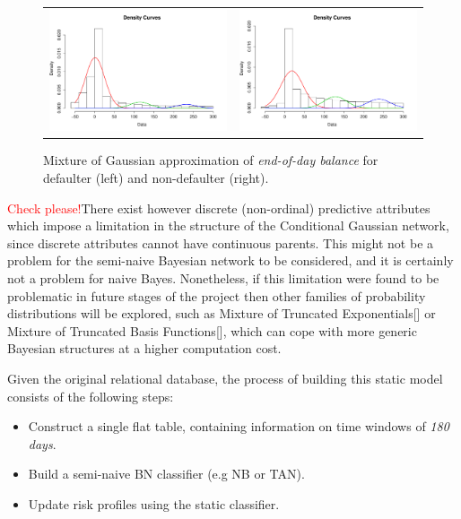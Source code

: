 \begin{figure}
  \centering
    \begin{tabular}{cc}
    \includegraphics[width=70mm]{figures/CajaMarmixtureBalanceDef}&
    \includegraphics[width=70mm]{figures/CajaMarmixtureBalanceNonDef}\\
  \end{tabular}
    \caption{\label{Figure:cajamarMixt}Mixture of Gaussian approximation of \textit{end-of-day balance} for defaulter (left) and non-defaulter (right).}
\end{figure}

\textcolor{red}{Check please!}There exist however discrete (non-ordinal) predictive attributes which impose a limitation in the structure of the Conditional Gaussian network, since discrete attributes cannot have continuous parents. This might not be a problem for the semi-naive Bayesian network to be considered, and it is certainly not a problem for naive Bayes. Nonetheless, if this limitation were found to be problematic in future stages of the project then other families of probability distributions will be explored, such as Mixture of Truncated Exponentials[] or Mixture of Truncated Basis Functions[], which can cope with more generic Bayesian structures at a higher computation cost. 

Given the original relational database, the process of building this static model consists of the following steps:

\begin{itemize}
\item Construct a single flat table, containing information on time windows of \emph{180 days}.
\item Build a semi-naive BN classifier (e.g NB or TAN). 
\item Update risk profiles using the static classifier.
\end{itemize}


